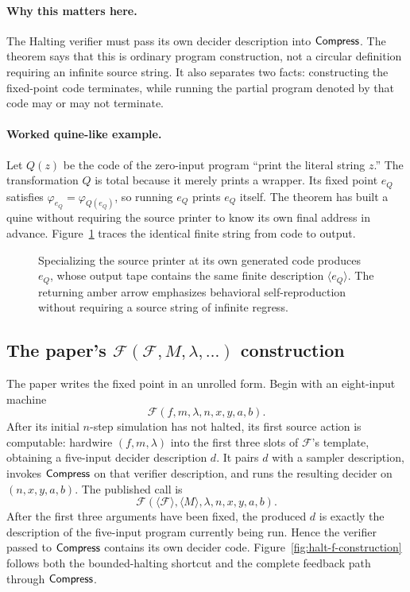 \paragraph{Why this matters here.}
The Halting verifier must pass its own decider description into \(\mathsf{Compress}\).
The theorem says that this is ordinary program construction, not a circular
definition requiring an infinite source string.  It also separates two facts:
constructing the fixed-point code terminates, while running the partial
program denoted by that code may or may not terminate.

\paragraph{Worked quine-like example.}
Let \(Q(z)\) be the code of the zero-input program ``print the literal string
\(z\).''  The transformation \(Q\) is total because it merely prints a
wrapper.  Its fixed point \(e_Q\) satisfies
\(\varphi_{e_Q}=\varphi_{Q(e_Q)}\), so running \(e_Q\) prints \(e_Q\) itself.
The theorem has built a quine without requiring the source printer to know its
own final address in advance.
Figure~\ref{fig:quine} traces the identical finite string from code to output.

\begin{figure}[t]
\centering

\caption{Specializing the source printer at its own generated code produces \(e_Q\), whose output tape contains the same finite description \(\langle e_Q\rangle\).  The returning amber arrow emphasizes behavioral self-reproduction without requiring a source string of infinite regress.}
\label{fig:quine}
\end{figure}

\subsection{The paper's
\texorpdfstring{\(\mathcal F(\mathcal F,M,\lambda,\ldots)\)}
{F(F,M,lambda,...)} construction}

The paper writes the fixed point in an unrolled form.  Begin with an
eight-input machine
\[
 \mathcal F(f,m,\lambda,n,x,y,a,b).
\]
After its initial \(n\)-step simulation has not halted, its first source action
is computable: hardwire
\((f,m,\lambda)\) into the first three slots of \(\mathcal F\)'s template, obtaining
a five-input decider description \(d\).  It pairs \(d\) with a sampler
description, invokes \(\mathsf{Compress}\) on that verifier description, and runs the
resulting decider on \((n,x,y,a,b)\).  The published call is
\[
 \mathcal F(\langle\mathcal F\rangle,\langle M\rangle,\lambda,n,x,y,a,b).
\]
After the first three arguments have been fixed, the produced \(d\) is exactly
the description of the five-input program currently being run.  Hence the
verifier passed to \(\mathsf{Compress}\) contains its own decider code.
Figure~\ref{fig:halt-f-construction} follows both the bounded-halting shortcut
and the complete feedback path through \(\mathsf{Compress}\).

